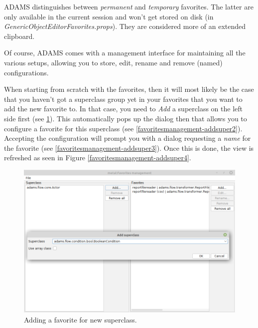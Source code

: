 ADAMS distinguishes between \textit{permanent} and \textit{temporary} favorites.
The latter are only available in the current session and won't get stored on 
disk (in \textit{GenericObjectEditorFavorites.props}). They are considered 
more of an extended clipboard.

Of course, ADAMS comes with a management interface for maintaining all the
various setups, allowing you to store, edit, rename and remove (named) 
configurations. 

\clearpage
{}
When starting from scratch with the favorites, then it will most likely be the
case that you haven't got a superclass group yet in your favorites that you want
to add the new favorite to. In that case, you need to \textit{Add} a superclass
on the left side first (see \ref{favoritesmanagement-addsuper1}). This
automatically pops up the dialog then that allows you to configure a favorite
for this superclass (see \ref{favoritesmanagement-addsuper2}). Accepting the
configuration will prompt you with a dialog requesting a \textit{name} for the
favorite (see \ref{favoritesmanagement-addsuper3}). Once this is done, the view
is refreshed as seen in Figure \ref{favoritesmanagement-addsuper4}.

\begin{figure}[htb]
  \centering
  \includegraphics[width=12.0cm]{images/favoritesmanagement-addsuper1.png}
  \caption{Adding a favorite for new superclass.}
  \label{favoritesmanagement-addsuper1}
\end{figure}

